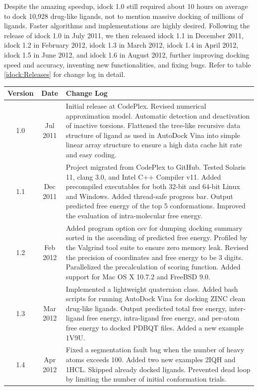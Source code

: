 Despite the amazing speedup, idock 1.0 still required about 10 hours on average to dock 10,928 drug-like ligands, not to mention massive docking of millions of ligands. Faster algorithms and implementations are highly desired. Following the release of idock 1.0 in July 2011, we then released idock 1.1 in December 2011, idock 1.2 in February 2012, idock 1.3 in March 2012, idock 1.4 in April 2012, idock 1.5 in June 2012, and idock 1.6 in August 2012, further improving docking speed and accuracy, inventing new functionalities, and fixing bugs. Refer to table \ref{idock:Releases} for change log in detail.

\begin{table}
\centering
\begin{tabular*}
{\linewidth}
{@{\extracolsep{\fill}}ccp{}}
\toprule
Version & Date & Change Log \\
\midrule
1.0 & Jul 2011 & Initial release at CodePlex. Revised numerical approximation model. Automatic detection and deactivation of inactive torsions. Flattened the tree-like recursive data structure of ligand as used in AutoDock Vina into simple linear array structure to ensure a high data cache hit rate and easy coding.\\
1.1 & Dec 2011 & Project migrated from CodePlex to GitHub. Tested Solaris 11, clang 3.0, and Intel C++ Compiler v11. Added precompiled executables for both 32-bit and 64-bit Linux and Windows. Added thread-safe progress bar. Output predicted free energy of the top 5 conformations. Improved the evaluation of intra-molecular free energy.\\
1.2 & Feb 2012 & Added program option csv for dumping docking summary sorted in the ascending of predicted free energy. Profiled by the Valgrind tool suite to ensure zero memory leak. Revised the precision of coordinates and free energy to be 3 digits. Parallelized the precalculation of scoring function. Added support for Mac OS X 10.7.2 and FreeBSD 9.0.\\
1.3 & Mar 2012 & Implemented a lightweight quaternion class. Added bash scripts for running AutoDock Vina for docking ZINC clean drug-like ligands. Output predicted total free energy, inter-ligand free energy, intra-ligand free energy, and per-atom free energy to docked PDBQT files. Added a new example 1V9U.\\
1.4 & Apr 2012 & Fixed a segmentation fault bug when the number of heavy atoms exceeds 100. Added two new examples 2IQH and 1HCL. Skipped already docked ligands. Prevented dead loop by limiting the number of initial conformation trials.\\

\end{tabular*}
\end{table}
